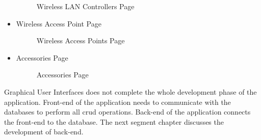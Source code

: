 \documentclass[a4Paper,12pt]{report}
\begin{document}
\begin{itemize}
\begin{figure}[H]
\caption{Wireless LAN Controllers Page}
\end{figure}
\item Wireless Access Point Page
\begin{figure}[H]
\centering
{}
\caption{Wireless Access Points Page}
\end{figure}
\item Accessories Page
\begin{figure}[H]
\centering
{}
\caption{Accessories Page}
\end{figure}
\end{itemize}
Graphical User Interfaces does not complete the whole development phase of the application. Front-end of the application needs to communicate with the databases to perform all crud operations. Back-end of the application connects the front-end to the database. The next segment chapter discusses the development of back-end.
\end{document}
